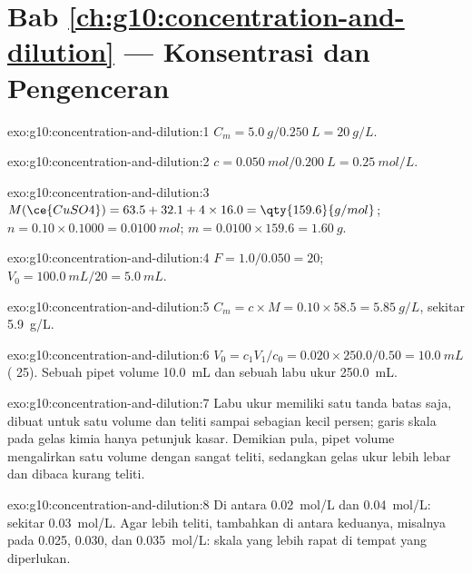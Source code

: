 \section*{Bab \ref{ch:g10:concentration-and-dilution} --- Konsentrasi dan Pengenceran}

\begin{solution}{exo:g10:concentration-and-dilution:1}
$C_m = \qty{5.0}{g} / \qty{0.250}{L} = \qty{20}{g/L}$.
\end{solution}

\begin{solution}{exo:g10:concentration-and-dilution:2}
$c = \qty{0.050}{mol} / \qty{0.200}{L} = \qty{0.25}{mol/L}$.
\end{solution}

\begin{solution}{exo:g10:concentration-and-dilution:3}
$M(\ce{CuSO4}) = 63.5 + 32.1 + 4 \times 16.0 = \qty{159.6}{g/mol}$;
$n = 0.10 \times 0.1000 = \qty{0.0100}{mol}$; $m = 0.0100 \times 159.6 =
\qty{1.60}{g}$.
\end{solution}

\begin{solution}{exo:g10:concentration-and-dilution:4}
$F = 1.0 / 0.050 = 20$; $V_0 = \qty{100.0}{mL} / 20 = \qty{5.0}{mL}$.
\end{solution}

\begin{solution}{exo:g10:concentration-and-dilution:5}
$C_m = c \times M = 0.10 \times 58.5 = \qty{5.85}{g/L}$, sekitar
\qty{5.9}{g/L}.
\end{solution}

\begin{solution}{exo:g10:concentration-and-dilution:6}
$V_0 = c_1 V_1 / c_0 = 0.020 \times 250.0 / 0.50 = \qty{10.0}{mL}$
( 25). Sebuah pipet volume \qty{10.0}{mL} dan sebuah
labu ukur \qty{250.0}{mL}.
\end{solution}

\begin{solution}{exo:g10:concentration-and-dilution:7}
Labu ukur memiliki satu tanda batas saja, dibuat untuk satu volume dan
teliti sampai sebagian kecil persen; garis skala pada gelas kimia hanya
petunjuk kasar. Demikian pula, pipet volume mengalirkan satu volume
dengan sangat teliti, sedangkan gelas ukur lebih lebar dan dibaca kurang
teliti.
\end{solution}

\begin{solution}{exo:g10:concentration-and-dilution:8}
Di antara \qty{0.02}{mol/L} dan \qty{0.04}{mol/L}: sekitar
\qty{0.03}{mol/L}. Agar lebih teliti, tambahkan  di antara
keduanya, misalnya pada 0.025, 0.030, dan \qty{0.035}{mol/L}: skala yang
lebih rapat di tempat yang diperlukan.
\end{solution}

